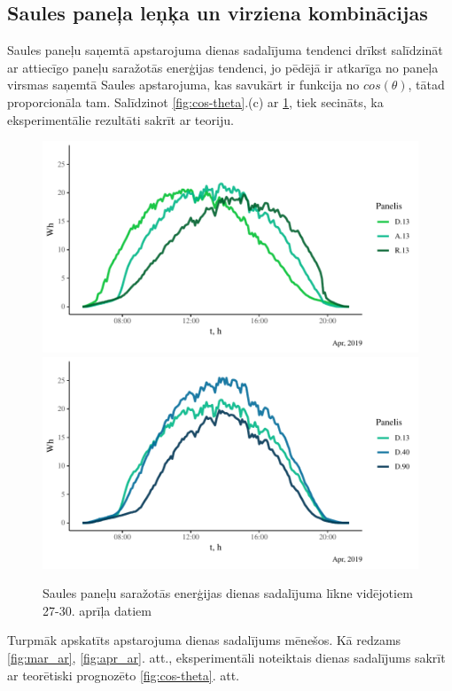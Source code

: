 \subsection{Saules paneļa leņķa un virziena kombinācijas}
\label{subsection:month_day}

Saules paneļu saņemtā apstarojuma dienas sadalījuma tendenci drīkst salīdzināt ar attiecīgo paneļu saražotās enerģijas tendenci, jo pēdējā ir atkarīga no paneļa virsmas saņemtā Saules apstarojuma, kas savukārt ir funkcija no $cos(\theta)$, tātad proporcionāla tam. Salīdzinot \ref{fig:cos-theta}.(c) ar 
\ref{fig:toldU}, tiek secināts, ka eksperimentālie rezultāti sakrīt ar teoriju.

\begin{figure}[h]
    \centering
    \includegraphics[width=\linewidth]{figures/sol_day/apr_LG_13.pdf}
    \includegraphics[width=\linewidth]{figures/sol_day/apr_LG_D.pdf}
    \caption{Saules paneļu saražotās enerģijas dienas sadalījuma līkne vidējotiem 27-30. aprīļa datiem} \label{fig:toldU}
\end{figure}

Turpmāk apskatīts apstarojuma dienas sadalījums mēnešos. Kā redzams \ref{fig:mar_ar}, \ref{fig:apr_ar}. att., eksperimentāli noteiktais dienas sadalījums sakrīt ar teorētiski prognozēto \ref{fig:cos-theta}. att.

